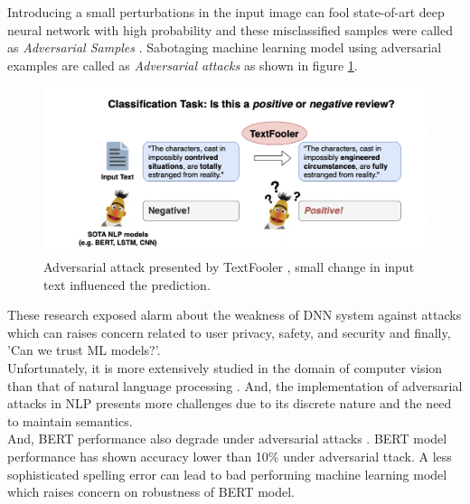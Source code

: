 \documentclass[%
	BCOR=8mm, %
	DIV=12, 
	toc=bibliography, %
	toc=listof, %
	oneside, %
	egregdoesnotlikesansseriftitles, %
	]{scrbook}
\begin{document}
Introducing a small perturbations in the input image can fool state-of-art deep neural network with high probability and these misclassified samples were called as
 \textit{Adversarial Samples} \cite{szegedy_intriguing_2014}. Sabotaging machine learning model using adversarial examples are called as \textit{Adversarial attacks} as shown 
 in figure \ref{diag:ExampleAdversarial}. 

\begin{figure}[h!]
\centering
\includegraphics[width=.97\textwidth]{img/Introduction-Fig-1.png}
\caption[Adversarial Example]{Adversarial attack presented by TextFooler \cite{jin_is_2020}, small change in input text influenced the prediction.}
\label{diag:ExampleAdversarial}
\end{figure}

These research exposed alarm about the weakness of DNN system against attacks which can raises concern related to user privacy, safety, and security and finally, 'Can we trust ML models?'.\\
Unfortunately, it is more extensively studied in the domain of computer vision than that of natural language processing \cite{wang_towards_2021}. And, the implementation of adversarial 
attacks in NLP presents more challenges due to its discrete nature and the need to maintain semantics\cite{li_bert-attack_2020}. \\

And, BERT performance also degrade under adversarial attacks \cite{li_bert-attack_2020,garg_bae_2020}. BERT model performance has shown accuracy lower than 10\% under adversarial 
ttack. A less sophisticated spelling error can lead to bad performing machine learning model \cite{sun_adv-bert_2020} which raises concern on robustness of BERT model. 
\end{document}
